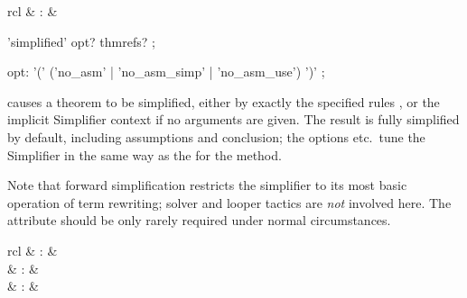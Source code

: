 \begin{isabellebody}
\begin{isamarkuptext}
\begin{descr}
  \end{descr}%
\end{isamarkuptext}%
\isamarkuptrue%
%
\isamarkuptrue%
%
\begin{isamarkuptext}%
\begin{matharray}{rcl}
    \mbox{} & : & \isaratt \\
  \end{matharray}

  \begin{rail}
    'simplified' opt? thmrefs?
    ;

    opt: '(' ('no\_asm' | 'no\_asm\_simp' | 'no\_asm\_use') ')'
    ;
  \end{rail}

  \begin{descr}
  
  \item [\mbox{\isa{simplified}}~\isa{{\isachardoublequote}a\isactrlsub {\isadigit{1}}\ {\isasymdots}\ a\isactrlsub n{\isachardoublequote}}]
  causes a theorem to be simplified, either by exactly the specified
  rules , or the implicit Simplifier
  context if no arguments are given.  The result is fully simplified
  by default, including assumptions and conclusion; the options  etc.\ tune the Simplifier in the same way as the for the
   method.

  Note that forward simplification restricts the simplifier to its
  most basic operation of term rewriting; solver and looper tactics
  \cite{isabelle-ref} are \emph{not} involved here.  The  attribute should be only rarely required under normal
  circumstances.

  \end{descr}%
\end{isamarkuptext}%
\isamarkuptrue%
%
\isamarkuptrue%
%
\begin{isamarkuptext}%
\begin{matharray}{rcl}
    \mbox{}\isa{{\isachardoublequote}\isactrlsup {\isacharasterisk}{\isachardoublequote}} & : & \isarmeth \\
    \mbox{}\isa{{\isachardoublequote}\isactrlsup {\isacharasterisk}{\isachardoublequote}} & : & \isarmeth \\
    \mbox{}\isa{{\isachardoublequote}\isactrlsup {\isacharasterisk}{\isachardoublequote}} & : & \isarmeth \\
  \end{matharray}


\end{isamarkuptext}
\end{isabellebody}
